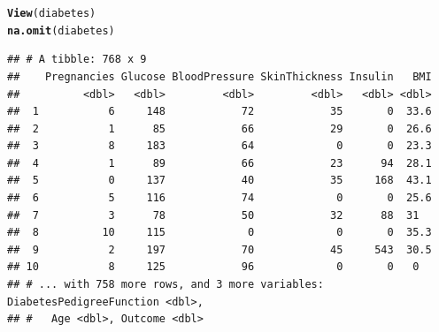 \documentclass{article}\usepackage[]{graphicx}\usepackage[]{color}
\makeatletter
\newcommand{\hlstd}[1]{\textcolor[rgb]{0.345,0.345,0.345}{#1}}%
\newcommand{\hlkwd}[1]{\textcolor[rgb]{0.737,0.353,0.396}{\textbf{#1}}}%
\newenvironment{kframe}{%
 \def\at@end@of@kframe{}%
 \ifinner\ifhmode%
  \def\at@end@of@kframe{\end{minipage}}%
  \begin{minipage}{\columnwidth}%
 \fi\fi%
 \def\FrameCommand##1{\hskip\@totalleftmargin \hskip-\fboxsep
 \colorbox{shadecolor}{##1}\hskip-\fboxsep
     \hskip-\linewidth \hskip-\@totalleftmargin \hskip\columnwidth}%
 \MakeFramed {\advance\hsize-\width
   \@totalleftmargin\z@ \linewidth\hsize
   \@setminipage}}%
 {\par\unskip\endMakeFramed%
 \at@end@of@kframe}
\newenvironment{knitrout}{}{} %
\makeatother
\begin{document}
\begin{knitrout}
\color{fgcolor}\begin{kframe}
\begin{alltt}
\hlkwd{View}\hlstd{(diabetes)}
\hlkwd{na.omit}\hlstd{(diabetes)}
\end{alltt}
\begin{verbatim}
## # A tibble: 768 x 9
##    Pregnancies Glucose BloodPressure SkinThickness Insulin   BMI
##          <dbl>   <dbl>         <dbl>         <dbl>   <dbl> <dbl>
##  1           6     148            72            35       0  33.6
##  2           1      85            66            29       0  26.6
##  3           8     183            64             0       0  23.3
##  4           1      89            66            23      94  28.1
##  5           0     137            40            35     168  43.1
##  6           5     116            74             0       0  25.6
##  7           3      78            50            32      88  31  
##  8          10     115             0             0       0  35.3
##  9           2     197            70            45     543  30.5
## 10           8     125            96             0       0   0  
## # ... with 758 more rows, and 3 more variables: DiabetesPedigreeFunction <dbl>,
## #   Age <dbl>, Outcome <dbl>
\end{verbatim}
\end{kframe}
\end{knitrout}
\end{document}
